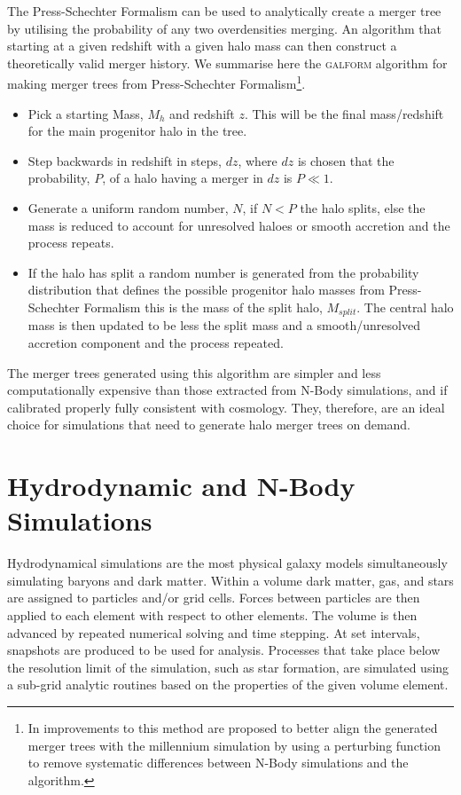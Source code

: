 The Press-Schechter Formalism can be used to analytically create a merger tree by utilising the probability of any two overdensities merging. An algorithm that starting at a given redshift with a given halo mass can then construct a theoretically valid merger history. We summarise here the \textsc{galform} \citep{Cole2000} algorithm for making merger trees from Press-Schechter Formalism\footnote{In \citet{Parkinson2008GeneratingTrees} improvements to this method are proposed to better align the generated merger trees with the millennium simulation by using a perturbing function to remove systematic differences between N-Body simulations and the algorithm.}.

\begin{itemize}
    \item Pick a starting Mass, $M_{h}$ and redshift $z$. This will be the final mass/redshift for the main progenitor halo in the tree.
    \item Step backwards in redshift in steps, $dz$, where $dz$ is chosen that the probability, $P$, of a halo having a merger in $dz$ is $P\ll1$.
    \item Generate a uniform random number, $N$, if $N<P$ the halo splits, else the mass is reduced to account for unresolved haloes or smooth accretion and the process repeats.
    \item If the halo has split a random number is generated from the probability distribution that defines the possible progenitor halo masses from  Press-Schechter Formalism this is the mass of the split halo, $M_{split}$. The central halo mass is then updated to be less the split mass and a smooth/unresolved accretion component and the process repeated.
\end{itemize}

The merger trees generated using this algorithm are simpler and less computationally expensive than those extracted from N-Body simulations, and if calibrated properly fully consistent with \LCDM cosmology. They, therefore, are an ideal choice for simulations that need to generate halo merger trees on demand.

\section{Hydrodynamic and N-Body Simulations}
\label{sec:Hydro}
Hydrodynamical simulations are the most physical galaxy models simultaneously simulating baryons and dark matter. Within a volume dark matter, gas, and stars are assigned to particles and/or grid cells. Forces between particles are then applied to each element with respect to other elements. The volume is then advanced by repeated numerical solving and time stepping. At set intervals, snapshots are produced to be used for analysis. Processes that take place below the resolution limit of the simulation, such as star formation, are simulated using a sub-grid analytic routines based on the properties of the given volume element.

